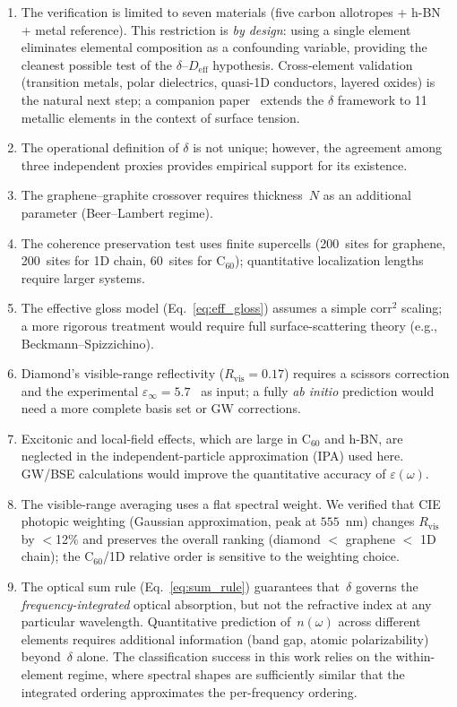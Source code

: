 \documentclass[twocolumn,showpacs,preprintnumbers,amsmath,amssymb,prb]{revtex4-2}
\begin{document}
\begin{enumerate}
  \item The verification is limited to seven materials (five carbon
    allotropes + h-BN + metal reference). This restriction is
    \emph{by design}: using a single element eliminates elemental
    composition as a confounding variable, providing the cleanest
    possible test of the $\delta$--$D_\mathrm{eff}$ hypothesis.
    Cross-element validation (transition metals, polar dielectrics,
    quasi-1D conductors, layered oxides) is the natural next step;
    a companion paper~\cite{SentoOpticsPaper2} extends the $\delta$
    framework to 11 metallic elements in the context of surface tension.
  \item The operational definition of $\delta$ is not unique; however,
    the agreement among three independent proxies provides empirical
    support for its existence.
  \item The graphene--graphite crossover requires thickness~$N$ as
    an additional parameter (Beer--Lambert regime).
  \item The coherence preservation test uses finite supercells
    (200~sites for graphene, 200~sites for 1D chain, 60~sites for
    C$_{60}$); quantitative localization lengths require larger systems.
  \item The effective gloss model (Eq.~\ref{eq:eff_gloss}) assumes a
    simple $\mathrm{corr}^2$ scaling; a more rigorous treatment would
    require full surface-scattering theory (e.g., Beckmann--Spizzichino).
  \item Diamond's visible-range reflectivity ($R_\mathrm{vis} = 0.17$)
    requires a scissors correction and the experimental
    $\varepsilon_\infty = 5.7$~\cite{Palik1998} as input; a fully \emph{ab initio} prediction
    would need a more complete basis set or GW corrections.
  \item Excitonic and local-field effects, which are large in C$_{60}$
    and h-BN, are neglected in the independent-particle approximation (IPA)
    used here. GW/BSE calculations would improve the quantitative accuracy
    of $\varepsilon(\omega)$.
  \item The visible-range averaging uses a flat spectral weight. We
    verified that CIE photopic weighting (Gaussian approximation,
    peak at $555$~nm) changes $R_\mathrm{vis}$ by $<$12\% and preserves
    the overall ranking (diamond $<$ graphene $<$ 1D chain); the
    C$_{60}$/1D relative order is sensitive to the weighting choice.
  \item The optical sum rule (Eq.~\ref{eq:sum_rule}) guarantees
    that~$\delta$ governs the \emph{frequency-integrated} optical
    absorption, but not the refractive index at any particular
    wavelength. Quantitative prediction of~$n(\omega)$ across
    different elements requires additional information
    (band gap, atomic polarizability) beyond~$\delta$ alone.
    The classification success in this work relies on the
    within-element regime, where spectral shapes are sufficiently
    similar that the integrated ordering approximates the
    per-frequency ordering.
\end{enumerate}
\end{document}
